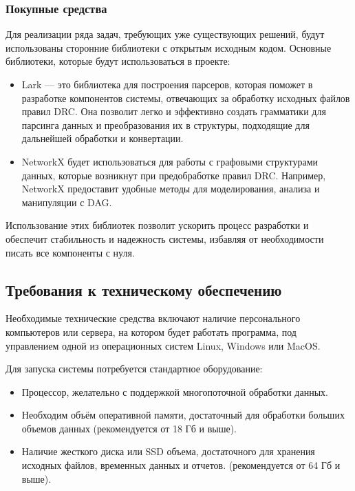 \subsubsection{Покупные средства}

Для реализации ряда задач, требующих уже существующих решений,
будут использованы сторонние библиотеки с открытым исходным кодом.
Основные библиотеки, которые будут использоваться в проекте:

\begin{itemize}
	\item Lark --- это библиотека для построения парсеров,
		которая поможет в разработке компонентов системы,
		отвечающих за обработку исходных файлов правил DRC.
		Она позволит легко и эффективно создать грамматики для парсинга данных
		и преобразования их в структуры,
		подходящие для дальнейшей обработки и конвертации.
	\item NetworkX будет использоваться для работы
		с графовыми структурами данных,
		которые возникнут при предобработке правил DRC.
		Например, NetworkX предоставит удобные методы для моделирования,
		анализа и манипуляции с DAG.
\end{itemize}

Использование этих библиотек позволит ускорить процесс разработки
и обеспечит стабильность и надежность системы,
избавляя от необходимости писать все компоненты с нуля.

\subsection{Требования к техническому обеспечению}

Необходимые технические средства включают
наличие персонального компьютеров или сервера,
на котором будет работать программа,
под управлением одной из операционных систем Linux, Windows или MacOS.

Для запуска системы потребуется стандартное оборудование:

\begin{itemize}
	\item Процессор, желательно с поддержкой многопоточной обработки данных.
	\item Необходим объём оперативной памяти,
		достаточный для обработки больших объемов данных
		(рекомендуется от 18 Гб и выше).
	\item Наличие жесткого диска или SSD объема, достаточного
		для хранения исходных файлов, временных данных и отчетов.
		(рекомендуется от 64 Гб и выше).
\end{itemize}

